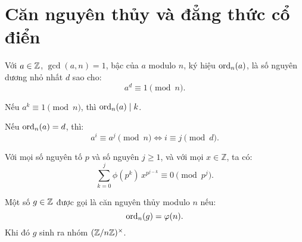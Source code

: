 \documentclass[../imo-training-open-book.tex]{subfiles}
\begin{document}
\newpage

\section{Căn nguyên thủy và đẳng thức cổ điển}

\begin{definition}
    \label{definition:order-modulo-n}
    Với \( a \in \mathbb Z \), \( \gcd(a, n) = 1 \), bậc của \( a \) modulo \( n \), ký hiệu \( \operatorname{ord}_n(a) \), là số nguyên dương nhỏ nhất \( d \) sao cho:
    \[
        a^d \equiv 1 \pmod{n}.
    \]
\end{definition}

\vspace{1em}

\begin{theorem}
    \label{theorem:order-divides-exponent}
    Nếu \( a^k \equiv 1 \pmod{n} \), thì \( \operatorname{ord}_n(a) \mid k \).
\end{theorem}

\vspace{1em}

\begin{lemma}
    \label{lemma:order-preserved}
    Nếu \( \operatorname{ord}_n(a) = d \), thì:
    \[
        a^i \equiv a^j \pmod{n} \iff i \equiv j \pmod{d}.
    \]
\end{lemma}

\vspace{1em}

\begin{lemma}
    \label{lemma:euler-power-sum-mod}
    Với mọi số nguyên tố \( p \) và số nguyên \( j \ge 1 \), và với mọi \( x \in \mathbb{Z} \), ta có:
    \[
        \sum_{k = 0}^{j} \phi\left(p^k\right)\, x^{p^{j - k}} \equiv 0 \pmod{p^j}.
    \]
\end{lemma}

\vspace{1em}

\begin{definition}
    \label{definition:primitive-root}
    Một số \( g \in \mathbb Z \) được gọi là căn nguyên thủy modulo \( n \) nếu:
    \[
        \operatorname{ord}_n(g) = \varphi(n).
    \]
    Khi đó \( g \) sinh ra nhóm \( (\mathbb Z/n\mathbb Z)^\times \).
\end{definition}
\end{document}
